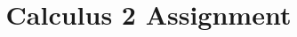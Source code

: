 \documentclass[twoside]{hcmut-report}
\title{Calculus 2 Assignment}
\begin{document}
\coverpage%

\tableofcontents
\clearpage







\newpage


\nocite{*}
\end{document}
